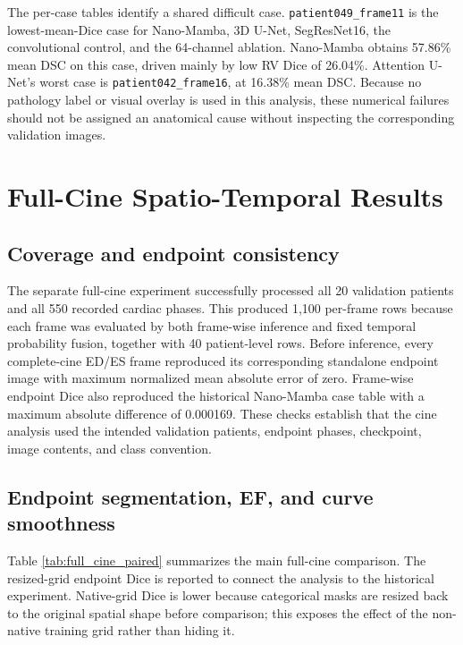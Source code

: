 The per-case tables identify a shared difficult case. \texttt{patient049\_frame11} is the lowest-mean-Dice case for Nano-Mamba, 3D U-Net, SegResNet16, the convolutional control, and the 64-channel ablation. Nano-Mamba obtains 57.86\% mean DSC on this case, driven mainly by low RV Dice of 26.04\%. Attention U-Net's worst case is \texttt{patient042\_frame16}, at 16.38\% mean DSC. Because no pathology label or visual overlay is used in this analysis, these numerical failures should not be assigned an anatomical cause without inspecting the corresponding validation images.

\section{Full-Cine Spatio-Temporal Results}
\subsection{Coverage and endpoint consistency}
The separate full-cine experiment successfully processed all 20 validation patients and all 550 recorded cardiac phases. This produced 1,100 per-frame rows because each frame was evaluated by both frame-wise inference and fixed temporal probability fusion, together with 40 patient-level rows. Before inference, every complete-cine ED/ES frame reproduced its corresponding standalone endpoint image with maximum normalized mean absolute error of zero. Frame-wise endpoint Dice also reproduced the historical Nano-Mamba case table with a maximum absolute difference of 0.000169. These checks establish that the cine analysis used the intended validation patients, endpoint phases, checkpoint, image contents, and class convention.

\subsection{Endpoint segmentation, EF, and curve smoothness}
Table \ref{tab:full_cine_paired} summarizes the main full-cine comparison. The resized-grid endpoint Dice is reported to connect the analysis to the historical experiment. Native-grid Dice is lower because categorical masks are resized back to the original spatial shape before comparison; this exposes the effect of the non-native training grid rather than hiding it.

